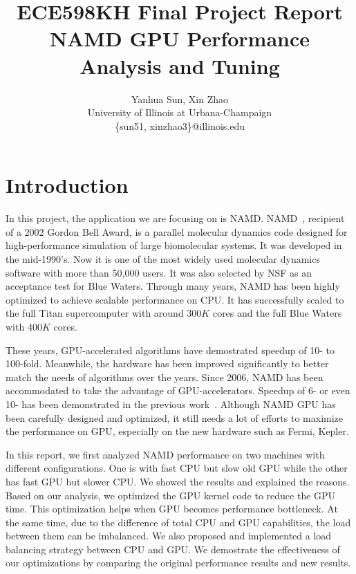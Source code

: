 \documentclass[11pt,onecolumn]{article}
\begin{document}

\title{ ECE598KH Final Project Report \\ NAMD GPU Performance Analysis and Tuning}

\author{
  Yanhua Sun, Xin Zhao\\
  University of Illinois at Urbana-Champaign\\
  \{sun51, xinzhao3\}@illinois.edu
}

\date{}
\maketitle

\lstset{
  basicstyle=\ttfamily,
  showstringspaces=false
}

%
%

\section{Introduction}
In this project, the application we are focusing on is NAMD.
NAMD~\cite{NamdSC02}, recipient of a 2002 Gordon Bell Award, is a parallel molecular 
dynamics code designed for high-performance simulation of large biomolecular systems.
It was developed in the mid-1990's. Now it is one of the most widely used molecular dynamics 
software with more than 50,000 users. It was also selected by NSF as an acceptance test
for Blue Waters.
Through many years, NAMD has been highly optimized to achieve scalable performance on CPU.
It has successfully scaled to the full Titan supercomputer with around $300K$ cores and 
the full Blue Waters with $400K$ cores.

These years, GPU-accelerated algorithms have demostrated speedup of 10- to 100-fold. Meanwhile, 
the hardware has been improved significantly to better match the needs of algorithms over the years.
Since 2006, NAMD has been accommodated to take the advantage of GPU-accelerators. Speedup of 
6- or even 10- has been demonstrated in the previous work~\cite{phillips_stone_namd_cuda}.
Although NAMD GPU has been carefully designed and optimized, it still needs a lot of 
efforts to maximize the performance on GPU, especially on the new hardware such as Fermi, Kepler. 

In this report, we first analyzed NAMD performance on two machines with different configurations.
One is with fast CPU but slow old GPU while the other has fast GPU but slower CPU. We showed 
the results and explained the reasons. Based on our analysis, we optimized the GPU kernel code
to reduce the GPU time. This optimization helps when GPU becomes performance bottleneck.
At the same time, due to the difference of total CPU and GPU capabilities, the load between them
can be imbalanced. We also proposed and implemented a load balancing strategy between CPU and GPU.
We demostrate the effectiveness of our optimizations by comparing the original performance results
and new results.
\end{document}
